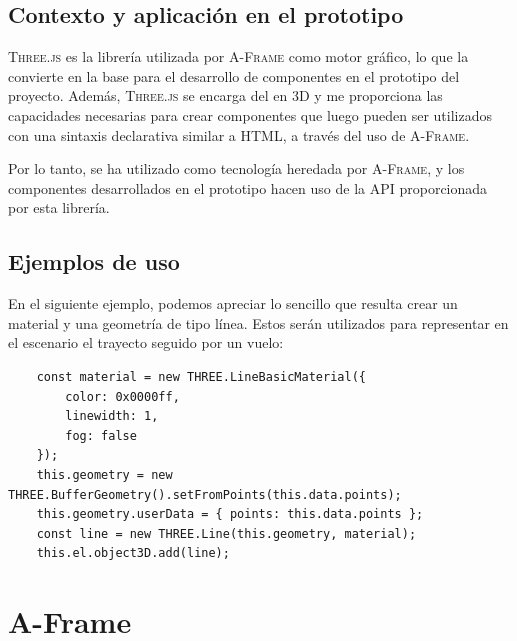 \documentclass[a4paper, 11pt]{book}
\begin{document}
\subsection{Contexto y aplicación en el prototipo}
\textsc{Three.js} es la librería utilizada por \textsc{A-Frame} como motor gráfico, lo que la convierte en la base para el desarrollo de componentes en el prototipo del proyecto. Además, \textsc{Three.js} se encarga del  en \textsc{3D} y me proporciona las capacidades necesarias para crear componentes que luego pueden ser utilizados con una sintaxis declarativa similar a \textsc{HTML}, a través del uso de \textsc{A-Frame}. 

Por lo tanto, se ha utilizado como tecnología heredada por \textsc{A-Frame}, y los componentes desarrollados en el prototipo hacen uso de la \textsc{API} proporcionada por esta librería.
\subsection{Ejemplos de uso}
En el siguiente ejemplo, podemos apreciar lo sencillo que resulta crear un material y una geometría de tipo línea. Estos serán utilizados para representar en el escenario el trayecto seguido por un vuelo:
\begin{verbatim}
	const material = new THREE.LineBasicMaterial({
		color: 0x0000ff,
		linewidth: 1,
		fog: false
	});
	this.geometry = new THREE.BufferGeometry().setFromPoints(this.data.points);
	this.geometry.userData = { points: this.data.points };
	const line = new THREE.Line(this.geometry, material);
	this.el.object3D.add(line);
\end{verbatim}
\section{A-Frame}
\label{sec:aframe}
\end{document}
